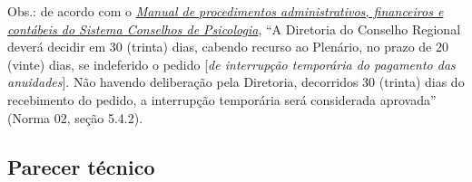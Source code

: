 \documentclass[openright, oneside, a4paper, article, brazil]{abntex2}
\begin{document}
\setasuspacing{\OnehalfSpace}\justifying
\begin{framed}
	\noindent\small Obs.: de acordo com o \href{https://transparencia.cfp.org.br/wp-content/uploads/sites/7/2020/05/Manual-de-Procedimentos-Administrativos-e-Financeiro-CFP-RES-20.2018.pdf}{\textcolor{crp1}{\textit{Manual de procedimentos administrativos, financeiros e contábeis do Sistema Conselhos de Psicologia}}}, ``A Diretoria do Conselho Regional deverá decidir em 30 (trinta) dias, cabendo recurso ao Plenário, no prazo de 20 (vinte) dias, se indeferido o pedido [\textit{de interrupção temporária do pagamento das anuidades}]. Não havendo deliberação pela Diretoria, decorridos 30 (trinta) dias do recebimento do pedido, a interrupção temporária será considerada aprovada'' (Norma 02, seção 5.4.2).
\end{framed}
\vfill
\clearpage
\setasuspacing{\DoubleSpace}\justifying
\subsection{Parecer técnico}
\end{document}
